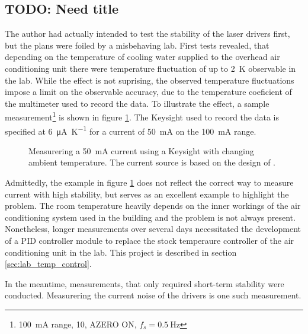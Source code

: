 \subsection{TODO: Need title}
The author had actually intended to test the stability of the laser drivers first, but the plans were foiled by a misbehaving lab. First tests revealed, that depending on the temperature of cooling water supplied to the overhead air conditioning unit there were temperature fluctuation of up to \qty{2}{\K} observable in the lab. While the effect is not suprising, the observed temperature fluctuations impose a limit on the observable accuracy, due to the temperature coeficient of the multimeter used to record the data. To illustrate the effect, a sample measurement\footnote{\qty{100}{\mA} range, \qty{10}{\plc}, AZERO ON, $f_s = \qty{0.5}{\Hz}$} is shown in figure \ref{fig:laser_driver_aircon}. The Keysight  used to record the data is specified at \qty{6}{\uA \per \K} for a current of \qty{50}{\mA} on the \qty{100}{\mA} range.

\begin{figure}[ht]
    \centering
    
    \caption{Measurering a \qty{50}{\mA} current using a Keysight  with changing ambient temperature. The current source is based on the design of \citeauthor{laser_driver_digital}.}
    \label{fig:laser_driver_aircon}
\end{figure}

Admittedly, the example in figure \ref{fig:laser_driver_aircon} does not reflect the correct way to measure current with high stability, but serves as an excellent example to highlight the problem. The room temperature heavily depends on the inner workings of the air conditioning system used in the building and the problem is not always present. Nonetheless, longer measurements over several days necessitated the development of a PID controller module to replace the stock temperaure controller of the air conditioning unit in the lab. This project is described in section \ref{sec:lab_temp_control}.

In the meantime, measurements, that only required short-term stability were conducted. Measurering the current noise of the drivers is one such measurement.

\clearpage
